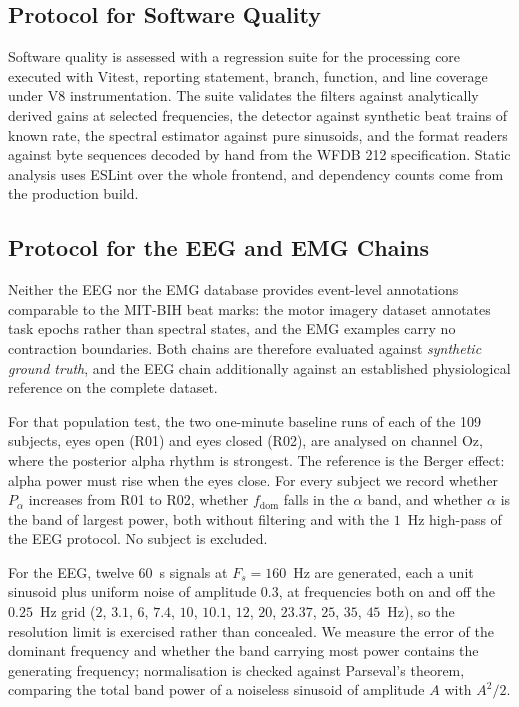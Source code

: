 \documentclass[conference]{IEEEtran}
\begin{document}
\subsection{Protocol for Software Quality}
\label{sec:protocol-software}

Software quality is assessed with a regression suite for the processing core executed with Vitest, reporting statement, branch, function, and line coverage under V8 instrumentation. The suite validates the filters against analytically derived gains at selected frequencies, the detector against synthetic beat trains of known rate, the spectral estimator against pure sinusoids, and the format readers against byte sequences decoded by hand from the WFDB 212 specification. Static analysis uses ESLint over the whole frontend, and dependency counts come from the production build.

\subsection{Protocol for the EEG and EMG Chains}
\label{sec:protocol-eegemg}

Neither the EEG nor the EMG database provides event-level annotations comparable to the MIT-BIH beat marks: the motor imagery dataset annotates task epochs rather than spectral states, and the EMG examples carry no contraction boundaries. Both chains are therefore evaluated against \emph{synthetic ground truth}, and the EEG chain additionally against an established physiological reference on the complete dataset.

For that population test, the two one-minute baseline runs of each of the 109 subjects, eyes open (R01) and eyes closed (R02), are analysed on channel Oz, where the posterior alpha rhythm is strongest. The reference is the Berger effect: alpha power must rise when the eyes close. For every subject we record whether $P_\alpha$ increases from R01 to R02, whether $f_{\mathrm{dom}}$ falls in the $\alpha$ band, and whether $\alpha$ is the band of largest power, both without filtering and with the $1$~Hz high-pass of the EEG protocol. No subject is excluded.

For the EEG, twelve $60$~s signals at $F_s=160$~Hz are generated, each a unit sinusoid plus uniform noise of amplitude $0.3$, at frequencies both on and off the $0.25$~Hz grid ($2$, $3.1$, $6$, $7.4$, $10$, $10.1$, $12$, $20$, $23.37$, $25$, $35$, $45$~Hz), so the resolution limit is exercised rather than concealed. We measure the error of the dominant frequency and whether the band carrying most power contains the generating frequency; normalisation is checked against Parseval's theorem, comparing the total band power of a noiseless sinusoid of amplitude $A$ with $A^{2}/2$.
\end{document}
